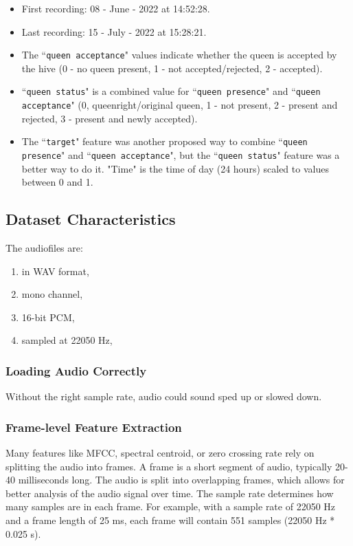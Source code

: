 \documentclass[12pt]{report}
\begin{document}
\begin{itemize}
\item First recording: 08 - June - 2022 at 14:52:28.
\item Last recording: 15 - July - 2022 at 15:28:21.
\item The ``{\tt queen acceptance}" values indicate whether the queen is accepted by the hive (0 - no queen present, 1 - not accepted/rejected, 2 - accepted).
\item ``{\tt queen status}" is a combined value for ``{\tt queen presence}" and ``{\tt queen acceptance}" (0, queenright/original queen, 1 - not present, 2 - present and rejected, 3 - present and newly accepted).
\item  The ``{\tt target}" feature was another proposed way to combine ``{\tt queen presence}" and ``{\tt queen acceptance}", but the ``{\tt queen status}" feature was a better way to do it. "Time" is the time of day (24 hours) scaled to values between 0 and 1.
\end{itemize}

\subsection{Dataset Characteristics}

The audiofiles are:
\begin{enumerate}[label=\roman*)]
	\item in WAV format,
	\item mono channel,
	\item 16-bit PCM,
	\item sampled at 22050 Hz,
\end{enumerate}

\subsubsection{Loading Audio Correctly}

\par Without the right sample rate, audio could sound sped up or slowed down.

\subsubsection{Frame-level Feature Extraction}

\par Many features like MFCC, spectral centroid, or zero crossing rate rely on splitting the audio into frames. A frame is a short segment of audio, typically 20-40 milliseconds long. The audio is split into overlapping frames, which allows for better analysis of the audio signal over time. The sample rate determines how many samples are in each frame. For example, with a sample rate of 22050 Hz and a frame length of 25 ms, each frame will contain 551 samples (22050 Hz * 0.025 s).
\end{document}
